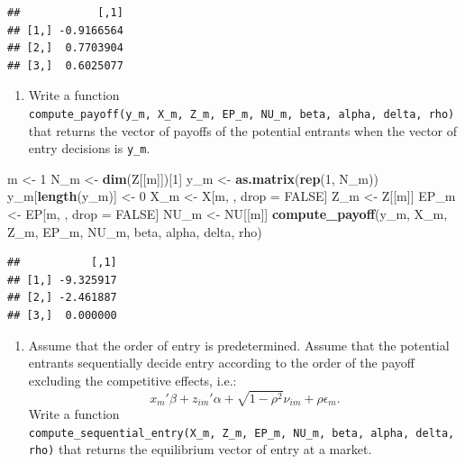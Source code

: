 \documentclass[]{book}
\newenvironment{Shaded}{\begin{snugshade}}{\end{snugshade}}
\newcommand{\KeywordTok}[1]{\textcolor[rgb]{0.13,0.29,0.53}{\textbf{#1}}}
\newcommand{\DecValTok}[1]{\textcolor[rgb]{0.00,0.00,0.81}{#1}}
\newcommand{\StringTok}[1]{\textcolor[rgb]{0.31,0.60,0.02}{#1}}
\newcommand{\OtherTok}[1]{\textcolor[rgb]{0.56,0.35,0.01}{#1}}
\newcommand{\NormalTok}[1]{#1}
\providecommand{\tightlist}{%
  \setlength{\itemsep}{0pt}\setlength{\parskip}{0pt}}
\begin{document}
\begin{verbatim}
##            [,1]
## [1,] -0.9166564
## [2,]  0.7703904
## [3,]  0.6025077
\end{verbatim}

\begin{enumerate}
\def\labelenumi{\arabic{enumi}.}
\setcounter{enumi}{3}
\tightlist
\item
  Write a function
  \texttt{compute\_payoff(y\_m,\ X\_m,\ Z\_m,\ EP\_m,\ NU\_m,\ beta,\ alpha,\ delta,\ rho)}
  that returns the vector of payoffs of the potential entrants when the
  vector of entry decisions is \texttt{y\_m}.
\end{enumerate}

\begin{Shaded}
\begin{Highlighting}[]
\NormalTok{m <-}\StringTok{ }\DecValTok{1}
\NormalTok{N_m <-}\StringTok{ }\KeywordTok{dim}\NormalTok{(Z[[m]])[}\DecValTok{1}\NormalTok{]}
\NormalTok{y_m <-}\StringTok{ }\KeywordTok{as.matrix}\NormalTok{(}\KeywordTok{rep}\NormalTok{(}\DecValTok{1}\NormalTok{, N_m))}
\NormalTok{y_m[}\KeywordTok{length}\NormalTok{(y_m)] <-}\StringTok{ }\DecValTok{0}
\NormalTok{X_m <-}\StringTok{ }\NormalTok{X[m, , drop =}\StringTok{ }\OtherTok{FALSE}\NormalTok{]}
\NormalTok{Z_m <-}\StringTok{ }\NormalTok{Z[[m]]}
\NormalTok{EP_m <-}\StringTok{ }\NormalTok{EP[m, , drop =}\StringTok{ }\OtherTok{FALSE}\NormalTok{]}
\NormalTok{NU_m <-}\StringTok{ }\NormalTok{NU[[m]]}
\KeywordTok{compute_payoff}\NormalTok{(y_m, X_m, Z_m, EP_m, NU_m, beta, alpha, delta, rho)}
\end{Highlighting}
\end{Shaded}

\begin{verbatim}
##           [,1]
## [1,] -9.325917
## [2,] -2.461887
## [3,]  0.000000
\end{verbatim}

\begin{enumerate}
\def\labelenumi{\arabic{enumi}.}
\setcounter{enumi}{4}
\tightlist
\item
  Assume that the order of entry is predetermined. Assume that the
  potential entrants sequentially decide entry according to the order of
  the payoff excluding the competitive effects, i.e.: \[
  x_m'\beta + z_{im}'\alpha + \sqrt{1 - \rho^2} \nu_{im} + \rho \epsilon_{m}.
  \] Write a function
  \texttt{compute\_sequential\_entry(X\_m,\ Z\_m,\ EP\_m,\ NU\_m,\ beta,\ alpha,\ delta,\ rho)}
  that returns the equilibrium vector of entry at a market.
\end{enumerate}
\end{document}
